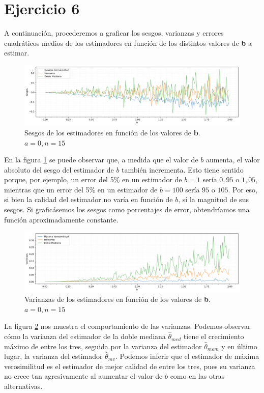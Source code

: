 \section{Ejercicio 6}
A continuación, procederemos a graficar los sesgos, varianzas y errores cuadráticos medios de los estimadores en función de los distintos valores de \textbf{b} a estimar.

\begin{figure}[H]
	\centering
	\includegraphics[width=1\textwidth]{imagenes/sesgos.png}
	\caption{\footnotesize Sesgos de los estimadores en función de los valores de \textbf{b}. $a=0, n=15$}
	\label{fig:ej6-sesgos}
\end{figure}

En la figura \ref{fig:ej6-sesgos} se puede observar que, a medida que el valor de $b$ aumenta, el valor absoluto del sesgo del estimador de $b$ también incrementa. Esto tiene sentido porque, por ejemplo, un error del 5\% en un estimador de $b=1$ sería $0,95$ o $1,05$, mientras que un error del 5\% en un estimador de $b = 100$ sería $95$ o $105$. Por eso, si bien la calidad del estimador no varía en función de $b$, sí la magnitud de sus sesgos. Si graficásemos los sesgos como porcentajes de error, obtendríamos una función aproximadamente constante.

\begin{figure}[H]
	\centering
	\includegraphics[width=1\textwidth]{imagenes/varianzas.png}
	\caption{\footnotesize Varianzas de los estimadores en función de los valores de \textbf{b}. $a=0, n=15$}
	\label{fig:ej6-varianzas}
\end{figure}

La figura \ref{fig:ej6-varianzas} nos muestra el comportamiento de las varianzas. Podemos observar cómo la varianza del estimador de la doble mediana $\hat{\theta}_{med}$ tiene el crecimiento máximo de entre los tres, seguida por la varianza del estimador $\hat{\theta}_{mom}$ y en último lugar, la varianza del estimador $\hat{\theta}_{mv}$. Podemos inferir que el estimador de máxima verosimilitud es el estimador de mejor calidad de entre los tres, pues su varianza no crece tan agresivamente al aumentar el valor de $b$ como en las otras alternativas.

